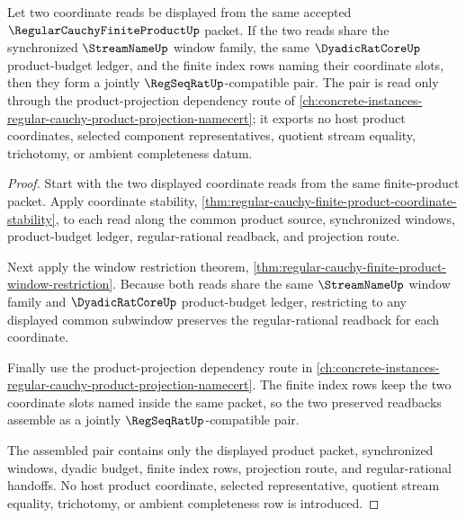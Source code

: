 \begin{theorem}
\label{thm:regular-cauchy-finite-product-coordinate-pairing}
Let two coordinate reads be displayed from the same accepted $\RegularCauchyFiniteProductUp$ packet. If the two reads share the synchronized $\StreamNameUp$ window family, the same $\DyadicRatCoreUp$ product-budget ledger, and the finite index rows naming their coordinate slots, then they form a jointly $\RegSeqRatUp$-compatible pair. The pair is read only through the product-projection dependency route of \autoref{ch:concrete-instances-regular-cauchy-product-projection-namecert}; it exports no host product coordinates, selected component representatives, quotient stream equality, trichotomy, or ambient completeness datum.
\end{theorem}
\begin{proof}
Start with the two displayed coordinate reads from the same finite-product packet. Apply coordinate stability, \autoref{thm:regular-cauchy-finite-product-coordinate-stability}, to each read along the common product source, synchronized windows, product-budget ledger, regular-rational readback, and projection route.

Next apply the window restriction theorem, \autoref{thm:regular-cauchy-finite-product-window-restriction}. Because both reads share the same $\StreamNameUp$ window family and $\DyadicRatCoreUp$ product-budget ledger, restricting to any displayed common subwindow preserves the regular-rational readback for each coordinate.

Finally use the product-projection dependency route in \autoref{ch:concrete-instances-regular-cauchy-product-projection-namecert}. The finite index rows keep the two coordinate slots named inside the same packet, so the two preserved readbacks assemble as a jointly $\RegSeqRatUp$-compatible pair.

The assembled pair contains only the displayed product packet, synchronized windows, dyadic budget, finite index rows, projection route, and regular-rational handoffs. No host product coordinate, selected representative, quotient stream equality, trichotomy, or ambient completeness row is introduced.
\end{proof}


